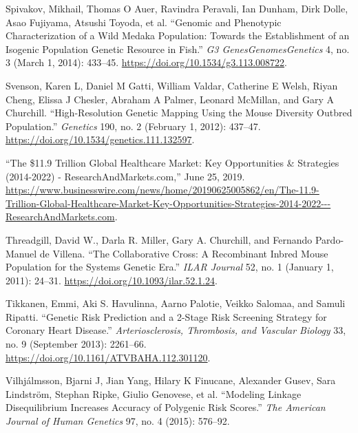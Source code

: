 \documentclass[
  9pt,
]{book}
\newlength{\cslhangindent}
\newlength{\cslentryspacingunit} %
\newenvironment{CSLReferences}[2] %
 {%
  \setlength{\parindent}{0pt}
  \ifodd #1
  \let\oldpar\par
  \def\par{\hangindent=\cslhangindent\oldpar}
  \fi
  \setlength{\parskip}{#2\cslentryspacingunit}
 }%
 {}
\begin{document}
\begin{CSLReferences}{1}{0}
\leavevmode{}%
Spivakov, Mikhail, Thomas O Auer, Ravindra Peravali, Ian Dunham, Dirk Dolle, Asao Fujiyama, Atsushi Toyoda, et al. {``Genomic and {Phenotypic Characterization} of a {Wild Medaka Population}: {Towards} the {Establishment} of an {Isogenic Population Genetic Resource} in {Fish}.''} \emph{G3 Genes\textbar Genomes\textbar Genetics} 4, no. 3 (March 1, 2014): 433--45. \url{https://doi.org/10.1534/g3.113.008722}.

\leavevmode{}%
Svenson, Karen L, Daniel M Gatti, William Valdar, Catherine E Welsh, Riyan Cheng, Elissa J Chesler, Abraham A Palmer, Leonard McMillan, and Gary A Churchill. {``High-{Resolution Genetic Mapping Using} the {Mouse Diversity Outbred Population}.''} \emph{Genetics} 190, no. 2 (February 1, 2012): 437--47. \url{https://doi.org/10.1534/genetics.111.132597}.

\leavevmode{}%
{``The \$11.9 {Trillion Global Healthcare Market}: {Key Opportunities} \& {Strategies} (2014-2022) - {ResearchAndMarkets}.com,''} June 25, 2019. \url{https://www.businesswire.com/news/home/20190625005862/en/The-11.9-Trillion-Global-Healthcare-Market-Key-Opportunities-Strategies-2014-2022---ResearchAndMarkets.com}.

\leavevmode{}%
Threadgill, David W., Darla R. Miller, Gary A. Churchill, and Fernando Pardo-Manuel de Villena. {``The {Collaborative Cross}: {A Recombinant Inbred Mouse Population} for the {Systems Genetic Era}.''} \emph{ILAR Journal} 52, no. 1 (January 1, 2011): 24--31. \url{https://doi.org/10.1093/ilar.52.1.24}.

\leavevmode{}%
Tikkanen, Emmi, Aki S. Havulinna, Aarno Palotie, Veikko Salomaa, and Samuli Ripatti. {``Genetic {Risk Prediction} and a 2-{Stage Risk Screening Strategy} for {Coronary Heart Disease}.''} \emph{Arteriosclerosis, Thrombosis, and Vascular Biology} 33, no. 9 (September 2013): 2261--66. \url{https://doi.org/10.1161/ATVBAHA.112.301120}.

\leavevmode{}%
Vilhjálmsson, Bjarni J, Jian Yang, Hilary K Finucane, Alexander Gusev, Sara Lindström, Stephan Ripke, Giulio Genovese, et al. {``Modeling Linkage Disequilibrium Increases Accuracy of Polygenic Risk Scores.''} \emph{The American Journal of Human Genetics} 97, no. 4 (2015): 576--92.


\end{CSLReferences}
\end{document}
